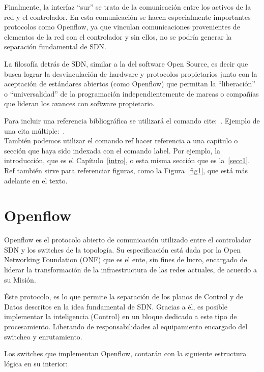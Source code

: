 \documentclass[12pt,a4paper,oneside]{book}
\begin{document}
Finalmente, la interfaz “sur” se trata de la comunicación entre los activos de la red y el controlador. En esta comunicación se hacen especialmente importantes protocolos como Openflow, ya que vinculan comunicaciones provenientes de elementos de la red con el controlador y sin ellos, no se podría generar la separación fundamental de SDN.
	
La filosofía detrás de SDN, similar a la del software Open Source, es decir que busca lograr la desvinculación de hardware y protocolos propietarios junto con la aceptación de estándares abiertos (como Openflow) que permitan la “liberación” o “universalidad” de la programación independientemente de marcas o compañías que lideran los avances con software propietario. 





Para incluir una referencia bibliográfica se utilizará el comando cite:~\cite{girard1989}.
Ejemplo de una cita múltiple:~\cite{ranta2012,tcs2015}.\\

También podemos utilizar el comando ref hacer referencia a una capítulo o sección que haya sido indexada con el comando label. Por ejemplo, la introducción, que es el Capítulo~\ref{intro}, o esta misma sección que es la~\ref{secc1}. Ref también sirve para referenciar figuras, como la Figura~\ref{fig1}, que está más adelante en el texto.



\section{Openflow}
\label{marco_openflow}

Openflow es el protocolo abierto de comunicación utilizado entre el controlador SDN y los switches de la topología. Su especificación está dada por la Open Networking Foundation (ONF) que es el ente, sin fines de lucro, encargado de liderar la transformación de la infraestructura de las redes actuales, de acuerdo a su Misión.

Éste protocolo, es lo que permite la separación de los planos de Control y de Datos descritos en la idea fundamental de SDN. Gracias a él, es posible implementar la inteligencia (Control) en un bloque dedicado a este tipo de procesamiento. Liberando de responsabilidades al equipamiento encargado del switcheo y enrutamiento.

	Los switches que implementan Openflow, contarán con la siguiente estructura lógica en su interior:
\end{document}
